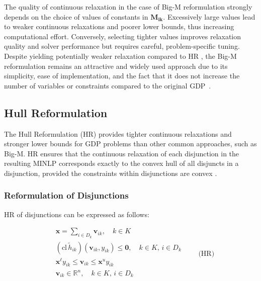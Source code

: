 \documentclass[11pt]{article}
\begin{document}
The quality of continuous relaxation in the case of Big-M reformulation strongly depends on the choice of values of constants in $\mathbf{M_{ik}}$.
Excessively large values lead to weaker continuous relaxations and poorer lower bounds, thus increasing computational effort.
Conversely, selecting tighter values improves relaxation quality and solver performance but requires careful, problem-specific tuning.
Despite yielding potentially weaker relaxation compared to HR \cite{grossmannGeneralizedConvexDisjunctive2003}, the Big-M reformulation remains an attractive and widely used approach due to its simplicity, ease of implementation, and the fact that it does not increase the number of variables or constraints compared to the original GDP~\cite{kronqvistStepsIntermediateRelaxations2021}.


\subsection{Hull Reformulation}


The Hull Reformulation (HR) provides tighter continuous relaxations and stronger lower bounds for GDP problems than other common approaches, such as Big-M.
HR ensures that the continuous relaxation of each disjunction in the resulting MINLP corresponds exactly to the convex hull of all disjuncts in a disjunction, provided the constraints within disjunctions are convex \cite{grossmannGeneralizedConvexDisjunctive2003,bernalneiraConvexMixedintegerNonlinear2024, kronqvistStepsIntermediateRelaxations2021}.



\subsubsection{ Reformulation of Disjunctions}
HR of disjunctions can be expressed as follows:

\begingroup
\begin{equation}
\begin{aligned}
    & \mathbf{x} = \sum_{i \in D_k} \mathbf{v}_{ik}, \quad k \in K \\
    & \left( \text{cl} \, \widetilde{h}_{ik} \right)(\mathbf{v}_{ik}, y_{ik}) \leq \mathbf{0}, \quad k \in K,\, i \in D_k \\
    & \mathbf x^{\ell} y_{ik} \leq \mathbf{v}_{ik} \leq \mathbf{x}^u y_{ik} \\
    & \mathbf{v}_{ik} \in \mathbb{R}^n, \quad k \in K,\, i \in D_k \\
\end{aligned}
\qquad \text{(HR)}
\label{eq:HR}
\end{equation}
\endgroup
\end{document}
